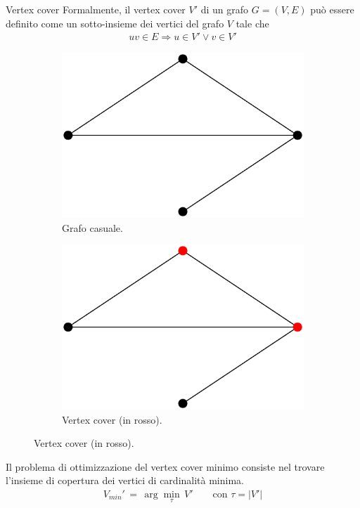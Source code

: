 \documentclass[a4paper]{beamer}
\begin{document}
\begin{frame}{Vertex cover}
Formalmente, il vertex cover $V'$ di un grafo $G=(V,E)$ può essere definito come un sotto-insieme dei vertici del grafo $V$ tale che
\begin{align*}
uv \in E \Rightarrow u \in V' \vee v \in V'
\end{align*}

\begin{figure}[h!]
     \centering
     \begin{subfigure}[t]{3cm}
         \includegraphics[width=\columnwidth]{images/graph.eps}
         \caption{Grafo casuale.}
     \end{subfigure}
     \hspace{0.8em}
     \begin{subfigure}[t]{3cm}
         \includegraphics[width=\columnwidth]{images/vc.eps}
         \caption{Vertex cover (in rosso).}
     \end{subfigure}
\end{figure}
Il problema di ottimizzazione del vertex cover minimo consiste nel trovare l'insieme di copertura dei vertici di cardinalità minima. 
\begin{align*}
V_{min}' \, = \, \arg\min_{\tau} \, V' \qquad \mbox{con } \tau= |V'|
\end{align*} 
\end{frame}
\end{document}
